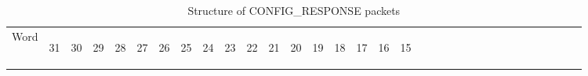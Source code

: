 \documentclass[11pt]{article}
\begin{document}
\begin{table}[h!]
    \centering
    \label{tab:configResponseDef}
    \caption{Structure of CONFIG\_RESPONSE packets}
    \begin{tabular}{|p{1cm}|m{0.04cm}|m{0.04cm}|m{0.04cm}|m{0.04cm}|m{0.04cm}|m{0.04cm}|m{0.04cm}|m{0.04cm}|m{0.04cm}|
        m{0.04cm}|m{0.04cm}|m{0.04cm}|m{0.04cm}|m{0.04cm}|m{0.04cm}|m{0.04cm}|m{0.04cm}|m{0.04cm}|m{0.04cm}|m{0.04cm}|
        m{0.04cm}|m{0.04cm}|m{0.04cm}|m{0.04cm}|m{0.04cm}|m{0.04cm}|m{0.04cm}|m{0.04cm}|m{0.04cm}|m{0.04cm}|m{0.04cm}|m{0.04cm}|}
        \hline
        Word & 
        \begin{sideways}31\end{sideways} &
        \begin{sideways}30\end{sideways} & 
        \begin{sideways}29\end{sideways} &
        \begin{sideways}28\end{sideways} &
        \begin{sideways}27\end{sideways} &
        \begin{sideways}26\end{sideways} &
        \begin{sideways}25\end{sideways} &
        \begin{sideways}24\end{sideways} &
        \begin{sideways}23\end{sideways} &
        \begin{sideways}22\end{sideways} &
        \begin{sideways}21\end{sideways} &
        \begin{sideways}20\end{sideways} &
        \begin{sideways}19\end{sideways} &
        \begin{sideways}18\end{sideways} &
        \begin{sideways}17\end{sideways} &
        \begin{sideways}16\end{sideways} &
        \begin{sideways}15\end{sideways} &

\end{tabular}
\end{table}
\end{document}
